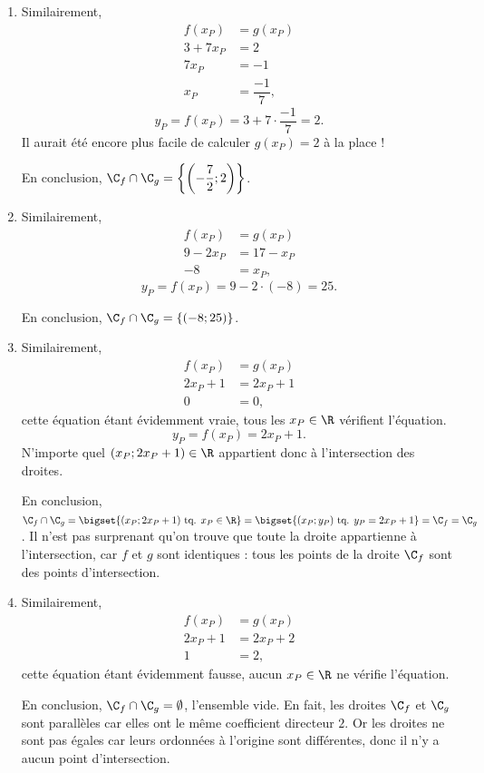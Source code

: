 {\begin{enumerate}
		\item 
			Similairement,
			\begin{align*}
				f(x_P) &= g(x_P) \\
				3 + 7x_P & = 2 \\
				7x_P &= -1 \\
				x_P &= \dfrac{-1}7,
			\end{align*}
			\[
				y_P = f(x_P) = 3+7\cdot \dfrac{-1}7  = 2.
			\]
			Il aurait été encore plus facile de calculer $g(x_P) = 2$ à la place !
			
			En conclusion, $\C_f \cap \C_g = \left\{ \left(-\dfrac72 ; 2\right) \right\}$.
		
		\item
			Similairement,
			\begin{align*}
				f(x_P) &= g(x_P) \\
				9-2x_P & = 17-x_P \\
				-8 &= x_P,
			\end{align*}
			\[
				y_P = f(x_P) = 9-2 \cdot(-8) = 25.
			\]
		
			En conclusion, $\C_f \cap \C_g = \left\{ (-8;25) \right\}$.
		
		\item 			
		Similairement,
			\begin{align*}
				f(x_P) &= g(x_P) \\
				2x_P + 1 & = 2x_P + 1 \\
				0 &= 0,
			\end{align*}
			cette équation étant évidemment vraie, tous les $x_P \in \R$ vérifient l'équation.
			\[
				y_P = f(x_P) = 2x_P + 1.
			\]
			N'importe quel $(x_P ; 2x_P+1) \in \R$ appartient donc à l'intersection des droites.
			
			En conclusion, $\C_f \cap \C_g = \bigset{ (x_P ; 2x_P+1) \text{ tq. } x_P \in \R } = \bigset{ (x_P ; y_P) \text{ tq. } y_P = 2x_P + 1 } = \C_f = \C_g$.
			Il n'est pas surprenant qu'on trouve que toute la droite appartienne à l'intersection, car $f$ et $g$ sont identiques : tous les points de la droite $\C_f$ sont des points d'intersection.
		
		
		\item 
			Similairement,
			\begin{align*}
				f(x_P) &= g(x_P) \\
				2x_P + 1 & = 2x_P + 2 \\
				1 &= 2,
			\end{align*}
			cette équation étant évidemment fausse, aucun $x_P \in \R$ ne vérifie l'équation.
			
			En conclusion, $\C_f \cap \C_g = \emptyset$, l'ensemble vide.
			En fait, les droites $\C_f$ et $\C_g$ sont parallèles car elles ont le même coefficient directeur $2$.
			Or les droites ne sont pas égales car leurs ordonnées à l'origine sont différentes, donc il n'y a aucun point d'intersection.
	\end{enumerate}

}

